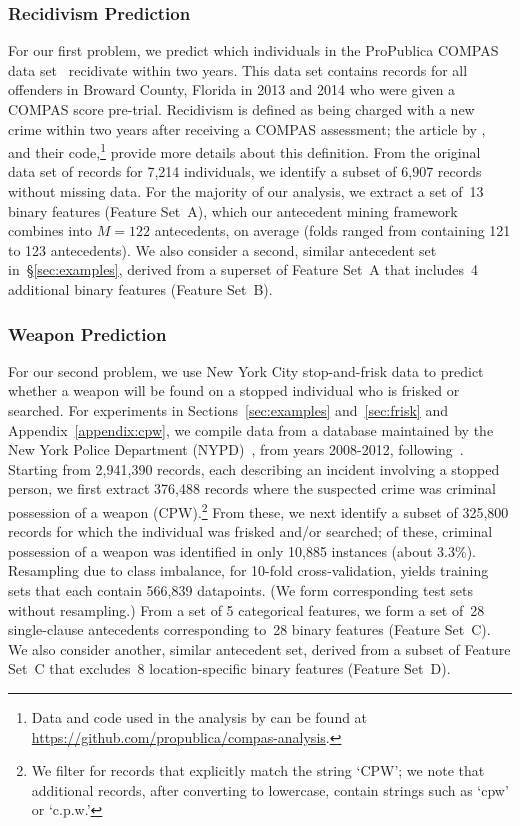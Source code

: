 \documentclass[twoside,11pt]{article}
\begin{document}
\subsubsection{Recidivism Prediction}
For our first problem, we predict which individuals in the ProPublica COMPAS
data set~\citep{LarsonMaKiAn16} recidivate within two years.
%
This data set contains records for all offenders in Broward County, Florida
in 2013 and 2014 who were given a COMPAS score pre-trial.
%
Recidivism is defined as being charged with a new crime within two years
after receiving a COMPAS assessment; the article by \citet{LarsonMaKiAn16},
and their code,\footnote{Data and code used in the analysis by \citet{LarsonMaKiAn16} can be found at \url{https://github.com/propublica/compas-analysis}.}
provide more details about this definition.
%
From the original data set of records for 7,214 individuals,
we identify a subset of 6,907 records without missing data.
%
For the majority of our analysis, we extract a set of~13 binary features (Feature Set~A),
which our antecedent mining framework combines into ${M=122}$ antecedents,
on average (folds ranged from containing 121 to 123 antecedents).
%
We also consider a second, similar antecedent set in~\S\ref{sec:examples},
derived from a superset of Feature Set~A that includes~4 additional binary features (Feature Set~B).

\subsubsection{Weapon Prediction}
For our second problem, we use New York City
stop-and-frisk data to predict whether a weapon will be found on a stopped
individual who is frisked or searched.
%
For experiments in Sections~\ref{sec:examples} and~\ref{sec:frisk} and Appendix~\ref{appendix:cpw},
we compile data from a database maintained by the New York Police Department (NYPD)~\citep{nypd},
from years 2008-2012, following~\citet{Goel16}.
%
Starting from 2,941,390 records, each describing an incident involving
a stopped person, we first extract 376,488 records where the suspected
crime was criminal possession of a weapon (CPW).\footnote{We filter for records that
explicitly match the string `CPW'; we note that additional records, after converting to
lowercase, contain strings such as `cpw' or `c.p.w.'}
%
From these, we next identify a subset of 325,800 records for which the
individual was frisked and/or searched; of these, criminal possession of a weapon
was identified in only 10,885 instances (about 3.3\%).
%
Resampling due to class imbalance, for 10-fold cross-validation, yields training sets
that each contain 566,839 datapoints. (We form corresponding test sets without resampling.)
%
From a set of 5 categorical features, we form a set of~28 single-clause antecedents
corresponding to~28 binary features (Feature Set~C).
%
We also consider another, similar antecedent set, derived from a subset of Feature Set~C
that excludes~8 location-specific binary features (Feature Set~D).
\end{document}
